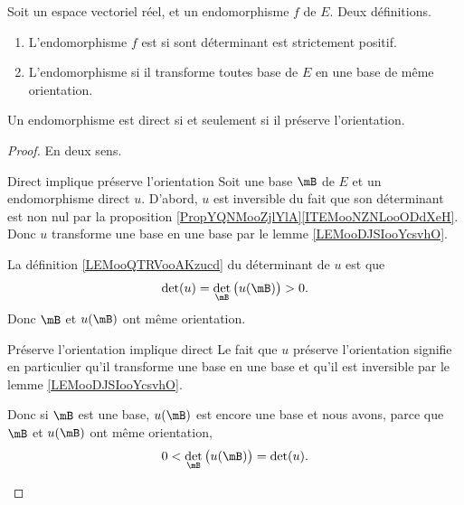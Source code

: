 \begin{propositionDef}        \label{PROPooNBAXooKNUrnk}
    Soit un espace vectoriel réel, et un endomorphisme \( f\) de \( E\). Deux définitions.
    \begin{enumerate}
        \item       \label{ITEMooOAXFooLIPHlW}
            L'endomorphisme \( f\) est  si sont déterminant est strictement positif.
        \item       \label{ITEMooNKYCooXTgKJA}
            L'endomorphisme  si il transforme toutes base de \( E\) en une base de même orientation.
    \end{enumerate}
    Un endomorphisme est direct si et seulement si il préserve l'orientation.
\end{propositionDef}

\begin{proof}
    En deux sens.
    \begin{subproof}
        \item[Direct implique préserve l'orientation]
            Soit une base \( \mB\) de \( E\) et un endomorphisme direct \( u\). D'abord, \( u\) est inversible du fait que son déterminant est non nul par la proposition \ref{PropYQNMooZjlYlA}\ref{ITEMooNZNLooODdXeH}. Donc \( u\) transforme une base en une base par le lemme \ref{LEMooDJSIooYcsvhO}.

            La définition \ref{LEMooQTRVooAKzucd} du déterminant de \( u\) est que
            \begin{equation}
                \det(u)=\det_{\mB}\big( u(\mB) \big)>0.
            \end{equation}
            Donc \( \mB\) et \( u(\mB)\) ont même orientation.
        \item[Préserve l'orientation implique direct]
            Le fait que \( u\) préserve l'orientation signifie en particulier qu'il transforme une base en une base et qu'il est inversible par le lemme \ref{LEMooDJSIooYcsvhO}.

            Donc si \( \mB\) est une base, \( u(\mB)\) est encore une base et nous avons, parce que \( \mB\) et \( u(\mB)\) ont même orientation,
            \begin{equation}
                0<\det_{\mB}\big( u(\mB) \big)=\det(u).
            \end{equation}
    \end{subproof}
\end{proof}

